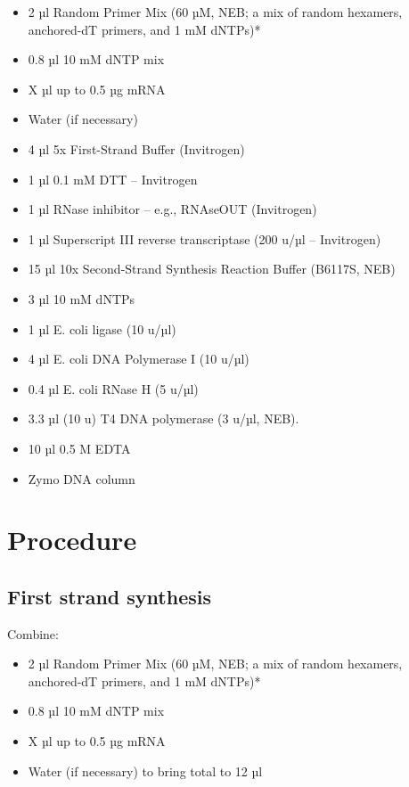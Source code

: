 \documentclass[
  letterpaper,
  DIV=11,
  numbers=noendperiod]{scrreprt}
\providecommand{\tightlist}{%
  \setlength{\itemsep}{0pt}\setlength{\parskip}{0pt}}\usepackage{longtable,booktabs,array}
\begin{document}
\begin{itemize}
\tightlist
\item
  2 µl Random Primer Mix (60 µM, NEB; a mix of random hexamers,
  anchored-dT primers, and 1 mM dNTPs)*
\item
  0.8 µl 10 mM dNTP mix
\item
  X µl up to 0.5 µg mRNA
\item
  Water (if necessary)
\item
  4 µl 5x First-Strand Buffer (Invitrogen)
\item
  1 µl 0.1 mM DTT -- Invitrogen
\item
  1 µl RNase inhibitor -- e.g., RNAseOUT (Invitrogen)
\item
  1 µl Superscript III reverse transcriptase (200 u/µl -- Invitrogen)
\item
  15 µl 10x Second-Strand Synthesis Reaction Buffer (B6117S, NEB)
\item
  3 µl 10 mM dNTPs
\item
  1 µl E. coli ligase (10 u/µl)
\item
  4 µl E. coli DNA Polymerase I (10 u/µl)
\item
  0.4 µl E. coli RNase H (5 u/µl)
\item
  3.3 µl (10 u) T4 DNA polymerase (3 u/µl, NEB).
\item
  10 µl 0.5 M EDTA
\item
  Zymo DNA column
\end{itemize}

\hypertarget{procedure-18}{%
\section{Procedure}\label{procedure-18}}

\hypertarget{first-strand-synthesis}{%
\subsection{First strand synthesis}\label{first-strand-synthesis}}

Combine:

\begin{itemize}
\tightlist
\item
  2 µl Random Primer Mix (60 µM, NEB; a mix of random hexamers,
  anchored-dT primers, and 1 mM dNTPs)*
\item
  0.8 µl 10 mM dNTP mix
\item
  X µl up to 0.5 µg mRNA
\item
  Water (if necessary) to bring total to 12 µl
\end{itemize}
\end{document}

